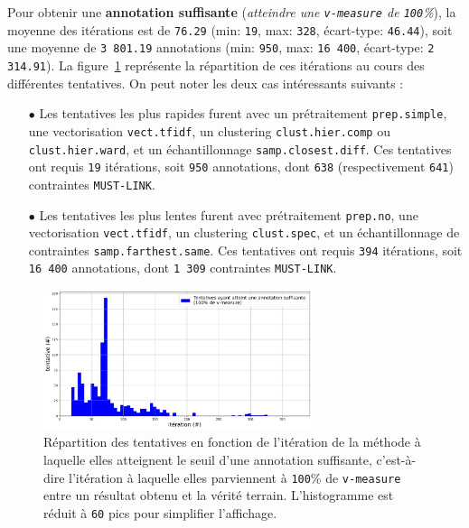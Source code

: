 			Pour obtenir une \textbf{annotation suffisante} (\textit{atteindre une \texttt{v-measure} de \texttt{100}\%}), la moyenne des itérations est de \texttt{76.29} (min: \texttt{19}, max: \texttt{328}, écart-type: \texttt{46.44}), soit une moyenne de \texttt{3 801.19} annotations (min: \texttt{950}, max: \texttt{16 400}, écart-type: \texttt{2 314.91}).
			La figure~\ref{figure:4.2.1-ETUDE-OPTIMISATION-HISTOGRAMME-ANNOTATION-SUFFISANTE} représente la répartition de ces itérations au cours des différentes tentatives.
			On peut noter les deux cas intéressants suivants :
			\begin{itemize}
				\item[\(\bullet\)] Les tentatives les plus rapides furent avec un prétraitement \texttt{prep.simple}, une vectorisation \texttt{vect.tfidf}, un clustering \texttt{clust.hier.comp} ou \texttt{clust.hier.ward}, et un échantillonnage \texttt{samp.closest.diff}. Ces tentatives ont requis \texttt{19} itérations, soit \texttt{950} annotations, dont \texttt{638} (respectivement \texttt{641}) contraintes \texttt{MUST-LINK}.
				\item[\(\bullet\)] Les tentatives les plus lentes furent avec prétraitement \texttt{prep.no}, une vectorisation \texttt{vect.tfidf}, un clustering \texttt{clust.spec}, et un échantillonnage de contraintes \texttt{samp.farthest.same}. Ces tentatives ont requis \texttt{394} itérations, soit \texttt{16 400} annotations, dont \texttt{1 309} contraintes \texttt{MUST-LINK}.
			\end{itemize}
			\begin{figure}[H]
				\centering
				\includegraphics[width=0.7\textwidth]{figures/etude-efficience-histogramme-annotation-suffisante}
				\caption{Répartition des tentatives en fonction de l'itération de la méthode à laquelle elles atteignent le seuil d'une annotation suffisante, c'est-à-dire l'itération à laquelle elles parviennent à \texttt{100}\% de \texttt{v-measure} entre un résultat obtenu et la vérité terrain. L'histogramme est réduit à \texttt{60} pics pour simplifier l'affichage.}
				\label{figure:4.2.1-ETUDE-OPTIMISATION-HISTOGRAMME-ANNOTATION-SUFFISANTE}
			\end{figure}
